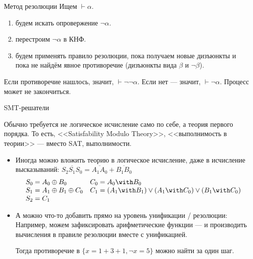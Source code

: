 \documentclass[aspectratio=169]{beamer}
\begin{document}
\begin{frame}{Метод резолюции}
Ищем $\vdash\alpha$.

\begin{enumerate}
\item будем искать опровержение $\neg\alpha$.
\item перестроим $\neg\alpha$ в КНФ.
\item будем применять правило резолюции, пока получаем новые дизъюнкты и пока 
не найдём явное противоречие (дизъюнкты вида $\beta$ и $\neg\beta$).
\end{enumerate}

Если противоречие нашлось, значит, $\vdash\neg\neg\alpha$. Если нет --- значит, $\vdash\neg\alpha$.
Процесс может не закончиться.
\end{frame}

\begin{frame}{SMT-решатели}

Обычно требуется не логическое исчисление само по себе, а теория первого порядка.
То есть, <<Satisfability Modulo Theory>>, <<выполнимость в теории>> --- вместо SAT, выполнимости.
\begin{itemize}
\item Иногда можно вложить теорию в логическое исчисление, 
даже в исчисление высказываний: $\overline{S_2S_1S_0} = \overline{A_1A_0}+\overline{B_1B_0}$
$$\begin{array}{ll}
S_0 = A_0 \oplus B_0 & C_0 = A_0 \with B_0\\
S_1 = A_1 \oplus B_1 \oplus C_0 & C_1 = (A_1 \with B_1) \vee (A_1 \with C_0) \vee (B_1 \with C_0) \\
S_2 = C_1\end{array}$$

\item А можно что-то добавить прямо на уровень унификации / резолюции:
Например, можем зафиксировать арифметические функции --- и производить вычисления
в правиле резолюции вместе с унификацией.

Тогда противоречие в $\{x = 1+3+1,\neg x = 5\}$ можно найти за один шаг.
\end{itemize}
\end{frame}
\end{document}
